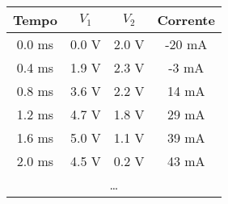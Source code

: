 \begin{tabular}{cccc}
\toprule
        Tempo &           $V_1$ &           $V_2$ &      Corrente \\
\midrule
 0.0 \si{\ms} &  0.0 \si{\volt} &  2.0 \si{\volt} &  -20 \si{\mA} \\
 0.4 \si{\ms} &  1.9 \si{\volt} &  2.3 \si{\volt} &   -3 \si{\mA} \\
 0.8 \si{\ms} &  3.6 \si{\volt} &  2.2 \si{\volt} &   14 \si{\mA} \\
 1.2 \si{\ms} &  4.7 \si{\volt} &  1.8 \si{\volt} &   29 \si{\mA} \\
 1.6 \si{\ms} &  5.0 \si{\volt} &  1.1 \si{\volt} &   39 \si{\mA} \\
 2.0 \si{\ms} &  4.5 \si{\volt} &  0.2 \si{\volt} &   43 \si{\mA} \\
 \multicolumn{4}{c}{\dots} \\
\bottomrule
\end{tabular}
